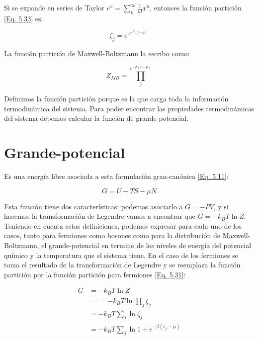 \documentclass[11pt,fleqn]{book}
\begin{document}
Si se expande en series de Taylor $e^{x}=\sum_{n}^{\infty}\frac{1}{n!}x^{n}$, entonces la función partición \ref{Eq. 5.33} es:

\begin{equation}
    \zeta_{j}=e^{e^{-\beta(\epsilon-\mu)}}
    \label{Eq. 5.34}
\end{equation}

La función partición de Maxwell-Boltzmann la escribo como:

\begin{equation}
    Z_{MB}=\prod_{j}^{e^{-\beta(\epsilon-\mu)}}
\end{equation}

Definimos la función partición porque es la que carga toda la información termodinámica del sistema. Para poder encontrar las propiedades termodinámicas del sistema debemos calcular la función de grande-potencial.

\section{Grande-potencial}

Es una energía libre asociada a esta formulación gran-canónica \ref{Eq. 5.11}:

\begin{equation*}
    G=U-TS-\mu N
\end{equation*}

Esta función tiene dos características: podemos asociarlo a $G=-PV$, y si hacemos la transformación de Legendre vamos a encontrar que $G=-k_{B}T\ln{Z}$. Teniendo en cuenta estas definiciones, podemos expresar para cada uno de los casos, tanto para fermiones como bosones como para la distribución de Maxwell-Boltzmann, el grande-potencial en termino de los niveles de energía del potencial químico y la temperatura que el sistema tiene. En el caso de los fermiones se toma el resultado de la transformación de Legendre y se reemplaza la función partición por la función partición para fermiones \ref{Eq. 5.31}:

\begin{equation}
    \begin{split}
        G&=-k_{B}T\ln{Z}\\
        &==-k_{B}T\ln{\prod_{j}\zeta_{j}}\\
        &=-k_{B}T\sum_{j}\ln{\zeta_{j}}\\
        &=-k_{B}T\sum_{j}\ln{1+e^{-\beta(\epsilon_{j}-\mu)}}\\
    \end{split}
\end{equation}
\end{document}
